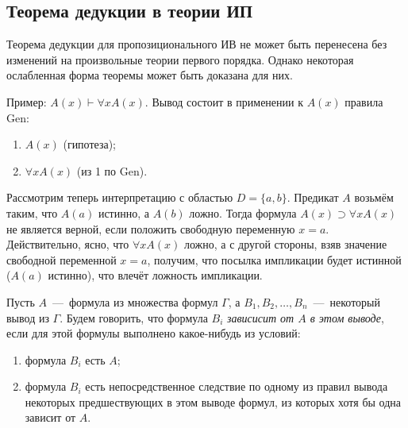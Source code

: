 \subsection{Теорема дедукции в теории ИП}\label{par:deduction_th}
Теорема дедукции для пропозиционального ИВ не может быть перенесена без изменений на произвольные теории первого порядка. Однако некоторая ослабленная форма теоремы может быть доказана для них.

Пример: $A(x) \vdash \forall xA(x)$. Вывод состоит в применении к $A(x)$ правила Gen:
\begin{enumerate}
    \item $A(x)$ (гипотеза);
    \item $\forall xA(x)$ (из 1 по Gen).
\end{enumerate}
Рассмотрим теперь интерпретацию с областью $D = \{a, b\}$. Предикат $A$ возьмём таким, что $A(a)$ истинно, а $A(b)$ ложно. Тогда формула $A(x) \supset \forall xA(x)$ не является верной, если положить свободную переменную $x = a$. Действительно, ясно, что $\forall xA(x)$ ложно, а с другой стороны, взяв значение свободной переменной $x = a$, получим, что посылка импликации будет истинной ($A(a)$ истинно), что влечёт ложность импликации.

Пусть $A$~---~формула из множества формул $\Gamma$, а $B_1, B_2, \dots, B_n$~---~некоторый вывод из $\Gamma$. Будем говорить, что формула $B_i$ \textit{зависисит от $A$ в этом выводе}, если для этой формулы выполнено какое-нибудь из условий:
\begin{enumerate}
    \item формула $B_i$ есть $A$;
    \item формула $B_i$ есть непосредственное следствие по одному из правил вывода некоторых предшествующих в этом выводе формул, из которых хотя бы одна зависит от $A$.
\end{enumerate}

